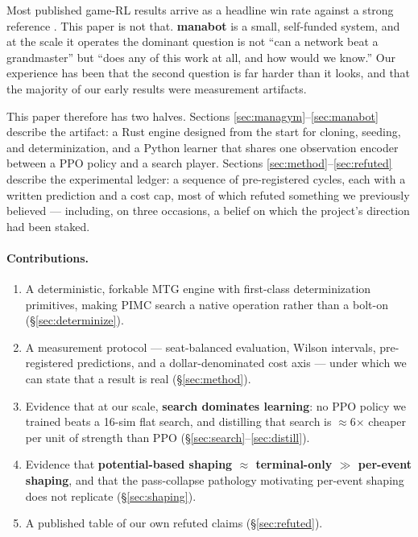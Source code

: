 \documentclass[11pt]{article}
\begin{document}
Most published game-RL results arrive as a headline win rate against a strong reference \citep{silver2018alphazero,vinyals2019starcraft,bakhtin2022cicero}. This paper is not that. \textbf{manabot} is a small, self-funded system, and at the scale it operates the dominant question is not ``can a network beat a grandmaster'' but ``does any of this work at all, and how would we know.'' Our experience has been that the second question is far harder than it looks, and that the majority of our early results were measurement artifacts.

This paper therefore has two halves. Sections \ref{sec:managym}--\ref{sec:manabot} describe the artifact: a Rust engine designed from the start for cloning, seeding, and determinization, and a Python learner that shares one observation encoder between a PPO policy and a search player. Sections \ref{sec:method}--\ref{sec:refuted} describe the experimental ledger: a sequence of pre-registered cycles, each with a written prediction and a cost cap, most of which refuted something we previously believed --- including, on three occasions, a belief on which the project's direction had been staked.

\paragraph{Contributions.}
\begin{enumerate}\itemsep2pt
\item A deterministic, forkable MTG engine with first-class determinization primitives, making PIMC search a native operation rather than a bolt-on (\S\ref{sec:determinize}).
\item A measurement protocol --- seat-balanced evaluation, Wilson intervals, pre-registered predictions, and a dollar-denominated cost axis --- under which we can state that a result is real (\S\ref{sec:method}).
\item Evidence that at our scale, \textbf{search dominates learning}: no PPO policy we trained beats a 16-sim flat search, and distilling that search is $\approx$6$\times$ cheaper per unit of strength than PPO (\S\ref{sec:search}--\ref{sec:distill}).
\item Evidence that \textbf{potential-based shaping $\approx$ terminal-only $\gg$ per-event shaping}, and that the pass-collapse pathology motivating per-event shaping does not replicate (\S\ref{sec:shaping}).
\item A published table of our own refuted claims (\S\ref{sec:refuted}).
\end{enumerate}
\end{document}
